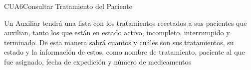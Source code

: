\begin{UseCase}{CUA6}{Consultar Tratamiento del Paciente}
    {
    	
    	Un Auxiliar tendrá una lista con los tratamientos recetados a sus pacientes que auxilian, tanto los que están en estado activo, incompleto, interrumpido y terminado. De esta manera sabrá cuantos y cuáles son sus tratamientos, su estado y la información de estos, como nombre de tratamiento, paciente al que fue asignado, fecha de expedición y número de medicamentos
    	
    	
    }


\end{UseCase}
